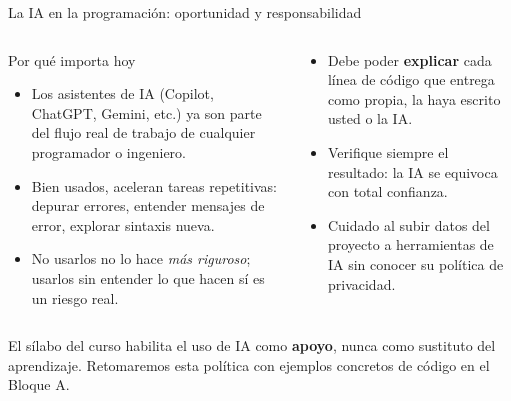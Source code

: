 \documentclass[aspectratio=169,11pt]{beamer}
\begin{document}
\begin{frame}{La IA en la programación: oportunidad y responsabilidad}
\small
\begin{columns}[T,onlytextwidth]
\begin{block}{Por qué importa hoy}
\begin{itemize}[itemsep=0pt,topsep=1pt]
  \item Los asistentes de IA (Copilot, ChatGPT, Gemini, etc.) ya son parte del flujo real de trabajo de cualquier programador o ingeniero.
  \item Bien usados, aceleran tareas repetitivas: depurar errores, entender mensajes de error, explorar sintaxis nueva.
  \item No usarlos no lo hace \textit{más riguroso}; usarlos sin entender lo que hacen sí es un riesgo real.
\end{itemize}
\end{block}
\begin{envbox}[title=Su responsabilidad]
\begin{itemize}[itemsep=0pt,topsep=1pt]
  \item Debe poder \textbf{explicar} cada línea de código que entrega como propia, la haya escrito usted o la IA.
  \item Verifique siempre el resultado: la IA se equivoca con total confianza.
  \item Cuidado al subir datos del proyecto a herramientas de IA sin conocer su política de privacidad.
\end{itemize}
\end{envbox}
\end{columns}
\vspace{0.08cm}
\begin{keybox}[top=2pt,bottom=2pt]
\footnotesize El sílabo del curso habilita el uso de IA como \textbf{apoyo}, nunca como sustituto del aprendizaje. Retomaremos esta política con ejemplos concretos de código en el Bloque A.
\end{keybox}
\end{frame}
\end{document}
